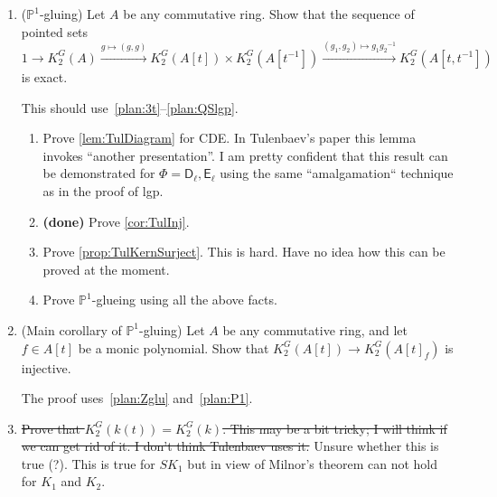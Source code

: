 \documentclass[oneside,12pt]{amsart}
\numberwithin{equation}{section}
\numberwithin{lem}{section}
\theoremstyle{definition}
\theoremstyle{remark}
\DeclareMathOperator{\St}{St^G}
\newcommand{\Pro}{\mathbb{P}}
\newcommand{\st}{\scriptstyle}
\newcommand{\rD}{\mathsf{D}}
\newcommand{\rE}{\mathsf{E}}
\begin{document}
\begin{enumerate}
(i) If $Ah+B=A$, i.e. the natural map $B\to A/Ah$ is surjective, then for any $x\in \St(A_h)$ there exist
$y\in \St(A)$ and $z\in \St(B_h)$ such that
$x=F_h(y)z$.

(ii) If moreover $Ah\cap B=Bh$, i.e. $B/Bh\to A/Ah$ is an isomorphism, and $h$ is not a zero divisor in $A$, then
the sequence of pointed sets
$$
K_2^G(B)\xrightarrow{\st g\mapsto (F_h(g),g)} K_2^G(B_h)\times K_2^G(A)\xrightarrow{\st (g_1,g_2)\mapsto g_1F_h(g_2)^{-1}}
K_2^G(A_h)
$$
is exact.

This should use something from the proof of~\eqref{plan:QSlgp} or~\eqref{plan:Zglu}; see~\cite[Lemma 3.4]{St-poly}.

\item\label{plan:P1} ($\Pro^1$-gluing) Let $A$ be any commutative ring. Show that the sequence of pointed sets
$$
1\longrightarrow K_2^G(A)\xrightarrow{\st g\mapsto (g,g)} K_2^G(A[t])\times K_2^G(A[t^{-1}])
\xrightarrow{\st (g_1,g_2)\mapsto g_1{g_2}^{-1}} K_2^G(A[t,t^{-1}])
$$
is exact.

This should use~\eqref{plan:3t}--\eqref{plan:QSlgp}.

\begin{enumerate}
 \item Prove \cref{lem:TulDiagram} for CDE. In Tulenbaev's paper this lemma invokes ``another presentation''.
  I am pretty confident that this result can be demonstrated for $\Phi=\rD_\ell, \rE_\ell$ using the same ``amalgamation`` technique as in the proof of lgp. 
 \item {\bf (done)} Prove \cref{cor:TulInj}.
 \item Prove \cref{prop:TulKernSurject}. This is hard. Have no idea how this can be proved at the moment. 
 \item Prove $\Pro^1$-glueing using all the above facts.
\end{enumerate}

\item\label{plan:[]f} (Main corollary of $\Pro^1$-gluing) Let $A$ be any commutative ring, and let $f\in A[t]$ be a monic polynomial. Show that
$K_2^G(A[t])\to K_2^G(A[t]_f)$ is injective.

The proof uses~\eqref{plan:Zglu} and~\eqref{plan:P1}.

\item\label{plan:k(t)} \sout{Prove that $K_2^G(k(t))=K_2^G(k)$. This may be a bit tricky; I will think if we can get rid of it. I don't think Tulenbaev uses it.} 
Unsure whether this is true (?). This is true for $SK_1$ but in view of Milnor's theorem can not hold for $K_1$ and $K_2$.


\end{enumerate}
\end{document}
